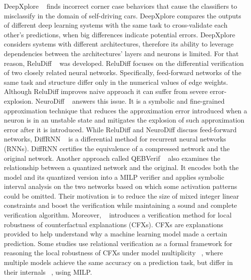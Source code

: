 DeepXplore ~\cite{DEEPXPLORE} finds incorrect corner case behaviors that cause the classifiers to misclassify in the domain of self-driving cars. DeepXplore compares the outputs of different deep learning systems with the same task to cross-validate each other’s predictions, when big differences indicate potential errors. DeepXplore considers systems with different architectures, therefore its ability to leverage dependencies between the architectures' layers and neurons is limited. For that reason, ReluDiff ~\cite{RELUDIFF} was developed. ReluDiff focuses on the differential verification of two closely related neural networks. Specifically, feed-forward networks of the same task and structure differ only in the numerical values of edge weights. Although ReluDiff improves naive approach it can suffer from severe error-explosion. NeuroDiff ~\cite{NEURODIFF} answers this issue. It is a symbolic and fine-grained approximation technique that reduces the approximation error introduced when a neuron is in an unstable state and mitigates the explosion of such approximation error after it is introduced. While ReluDiff and NeuroDiff discuss feed-forward networks, DiffRNN ~\cite{DIFFRNN} is a differential method for recurrent neural networks (RNNs). DiffRNN certifies the equivalence of a compressed network and the original network. Another approach called QEBVerif ~\cite{QEBVERIF} also examines the relationship between a quantized network and the original. It encodes both the model and its quantized version into a MILP verifier and applies symbolic interval analysis on the two networks based on which some activation patterns could be omitted. Their motivation is to reduce the size of mixed integer linear constraints and boost the verification while maintaining a sound and complete verification algorithm. Moreover, ~\cite{CFXROBUSTNESS} introduces a verification method for local robustness of counterfactual explanations (CFXs). CFXs are explanations provided to help understand why a machine learning model made a certain prediction. Some studies use relational verification as a formal framework for reasoning the local robustness of CFXs under model multiplicity  ~\cite{CFXROBUSTNESS}, where multiple models achieve the same accuracy on a prediction task, but differ in their internals ~\cite{PREDICTIVEMULTIPICITY}, using MILP.

